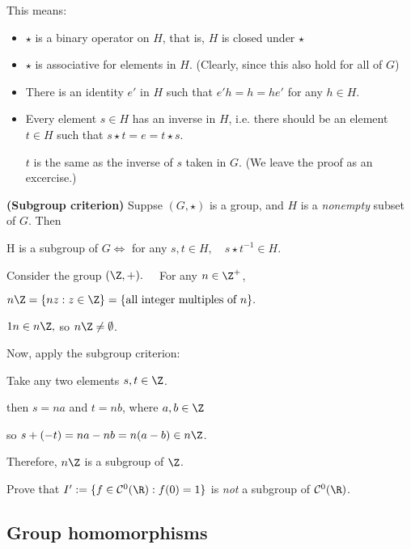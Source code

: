 \documentclass[a5paper]{article}
\begin{document}
This means:
\begin{itemize}
\item $\star$ is a binary operator on $H$, that is, $H$ is closed under $\star$
\item $\star$ is associative for elements in $H$. (Clearly, since this also hold for all of $G$)
\item There is an identity $e'$ in $H$ such that $e'h = h = he'$ for any $h \in H$.
\item Every element $s \in H$ has an inverse in $H$, i.e. there should be an element $t \in H$ such that $s \star t = e = t \star s$. 
\begin{remark}
$t$ is the same as the inverse of $s$ taken in $G$. (We leave the proof as an excercise.)
\end{remark}
\end{itemize}

\begin{proposition*}\textbf{(Subgroup criterion)}
Suppse $(G, \star)$ is a group, and $H$ is a \emph{nonempty} subset of $G$. Then
\begin{center}H is a subgroup of $G \iff$ for any $s,t \in H, \quad s \star t^{-1} \in H$. \end{center}
\begin{example*}
Consider the group $(\Z, +). \quad$ For any $n \in \Z^+$,

$n\Z = \{nz:z \in \Z\} = \{\text{all integer multiples of }n\}.$

$1n \in n\Z,$ so $n\Z \neq \emptyset$. 

Now, apply the subgroup criterion: 

Take any two elements $s,t \in \Z$. 

then $s = na$ and $t=nb$, where $a,b \in \Z$

so $s + (-t) = na - nb = n(a-b) \in n\Z$. 

Therefore, $n\Z$ is a subgroup of $\Z$.
\end{example*}
\end{proposition*}

\begin{exercise}
Prove that $I' := \{f\in \mathcal{C}^0(\R):f(0)=1\}$ is \emph{not} a subgroup of $\mathcal{C}^0(\R)$.
\end{exercise}

\subsection{Group homomorphisms}
\end{document}
